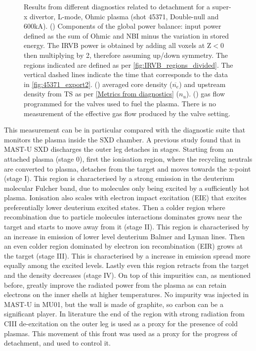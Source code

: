 \begin{figure}
\begin{subfigure}{0.8\linewidth}
         \vspace*{-7mm}
         \caption{\phantom{ww}}
         \label{fig:mu01_tomo5c}
     \end{subfigure}
     \vspace*{-3mm}
     \caption{Results from different diagnostics related to detachment for a super-x divertor, L-mode, Ohmic plasma (shot 45371, Double-null and 600kA). () Components of the global power balance: input power defined as the sum of Ohmic and NBI minus the variation in stored energy. The IRVB power is obtained by adding all voxels at Z$<$0 then multiplying by 2, therefore assuming up/down symmetry. The regions indicated are defined as per \autoref{fig:IRVB_regions_divided}. The vertical dashed lines indicate the time that corresponds to the data in \autoref{fig:45371_export2}. () averaged core density ($\overline{n_e}$) and upstream density from TS as per \autoref{Metrics from diagnostics} ($n_u$). () gas flow programmed for the valves used to fuel the plasma. There is no measurement of the effective gas flow produced by the valve setting.}
	\label{fig:mu01_tomo5}
\end{figure}

This measurement can be in particular compared with the diagnostic suite that monitors the plasma inside the SXD chamber. A previous study found that in MAST-U SXD discharges the outer leg detaches in stages.\cite{Verhaegh2022} Starting from an attached plasma (stage 0), first the ionisation region, where the recycling neutrals are converted to plasma, detaches from the target and moves towards the x-point (stage I). This region is characterised by a strong emission in the deuterium molecular Fulcher band, due to molecules only being excited by a sufficiently hot plasma. Ionisation also scales with electron impact excitation (EIE) that excites preferentially lower deuterium excited states. Then a colder region where recombination due to particle molecules interactions dominates grows near the target and starts to move away from it (stage II). This region is characterised by an increase in emission of lower level deuterium Balmer and Lyman lines. Then an even colder region dominated by electron ion recombination (EIR) grows at the target (stage III). This is characterised by a increase in emission spread more equally among the excited levels. Lastly even this region retracts from the target and the density decreases (stage IV). On top of this impurities can, as mentioned before, greatly improve the radiated power from the plasma as can retain electrons on the inner shells at higher temperatures. No impurity was injected in MAST-U in MU01, but the wall is made of graphite, so carbon can be a significant player. In literature the end of the region with strong radiation from CIII de-excitation on the outer leg is used as a proxy for the presence of cold plasmas.\cite{Reimerdes2017,Smolders2020a} This movement of this front was used as a proxy for the progress of detachment, and used to control it.\cite{Ravensbergen2020}

